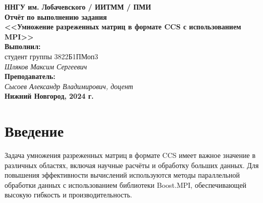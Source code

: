 \documentclass[12pt]{article}
\begin{document}
\begin{titlepage}
    \begin{center}
        \large
        \textbf{ННГУ им. Лобачевского / ИИТММ / ПМИ}\\[0.5cm]

        \vspace{4cm}
        \textbf{\Large Отчёт по выполнению задания}\\
        \textbf{\large <<Умножение разреженных матриц в формате CCS с использованием MPI>>}\\[3cm]

        \vspace{3cm}
        \textbf{Выполнил:}\\
        студент группы 3822Б1ПМоп3 \\
        \textit{Шляков Максим Сергеевич}\\[1cm]

        \textbf{Преподаватель:}\\
        \textit{Сысоев Александр Владимирович, доцент}\\[2cm]

        \vfill
        \textbf{Нижний Новгород, 2024 г.}
    \end{center}
\end{titlepage}

\section*{Введение}
Задача умножения разреженных матриц в формате CCS имеет важное значение в различных областях, включая научные расчёты и обработку больших данных. Для повышения эффективности вычислений используются методы параллельной обработки данных с использованием библиотеки Boost.MPI, обеспечивающей высокую гибкость и производительность.
\newpage

\end{document}
